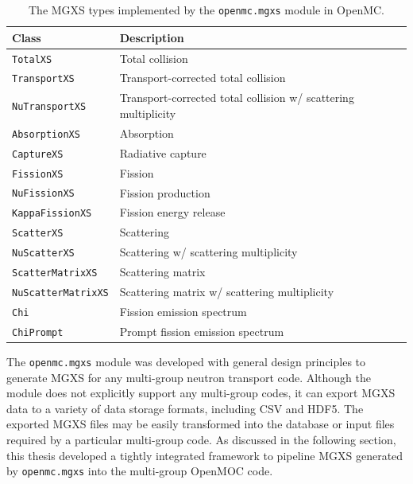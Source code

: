 \begin{table}[h!]
  \centering
  \caption[The MGXS types implemented for OpenMC]{The \ac{MGXS} types implemented by the \texttt{openmc.mgxs} module in OpenMC.}
  \small
  \label{table:chap4-mgxs-types} 
  \vspace{6pt}
  \begin{tabular}{l p{10cm}}
  \toprule
  \rowcolor{lightgray}
  {\bf Class} &
  {\bf Description} \\
  \midrule
  \texttt{TotalXS} & Total collision \\
  \texttt{TransportXS} & Transport-corrected total collision \\
  \texttt{NuTransportXS} & Transport-corrected total collision w/ scattering multiplicity \\
  \texttt{AbsorptionXS} & Absorption \\
  \texttt{CaptureXS} & Radiative capture \\
  \texttt{FissionXS} & Fission \\
  \texttt{NuFissionXS} & Fission production \\
  \texttt{KappaFissionXS} & Fission energy release \\
  \texttt{ScatterXS} & Scattering \\
  \texttt{NuScatterXS} & Scattering w/ scattering multiplicity \\
  \texttt{ScatterMatrixXS} & Scattering matrix \\
  \texttt{NuScatterMatrixXS} & Scattering matrix w/ scattering multiplicity \\
  \texttt{Chi} & Fission emission spectrum \\
  \texttt{ChiPrompt} & Prompt fission emission spectrum \\
  \bottomrule
\end{tabular}
\end{table}

The \texttt{openmc.mgxs} module was developed with general design principles to generate \ac{MGXS} for any multi-group neutron transport code. Although the module does not explicitly support any multi-group codes, it can export \ac{MGXS} data to a variety of data storage formats, including \ac{CSV} and \ac{HDF5}. The exported \ac{MGXS} files may be easily transformed into the database or input files required by a particular multi-group code. As discussed in the following section, this thesis developed a tightly integrated framework to pipeline \ac{MGXS} generated by \texttt{openmc.mgxs} into the multi-group OpenMOC code.

